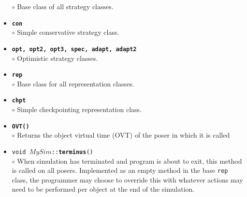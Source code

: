 \begin{itemize}
	$\circ$ Base class of all strategy classes.
\item {\tt {\bf con}}\\
	$\circ$ Simple conservative strategy class.
\item {\tt {\bf opt, opt2, opt3, spec, adapt, adapt2}}\\
	$\circ$ Optimistic strategy classes.
\item {\tt {\bf rep}}\\
	$\circ$ Base class for all representation classes.
\item {\tt {\bf chpt}}\\
	$\circ$ Simple checkpointing representation class.
\item {\tt {\bf OVT()}}\\
	$\circ$ Returns the object virtual time (OVT) of the poser in
	which it is called
\item {\tt void $MySim$::{\bf terminus}()}\\
	$\circ$ When simulation has terminated and program is about to exit, this method is called on all posers.  Implemented as an empty method in the base {\tt rep} class, the programmer may choose to override this with whatever actions may need to be performed per object at the end of the simulation.
\end{itemize}

